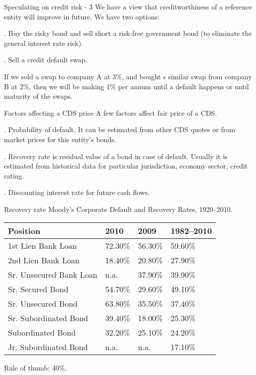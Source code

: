 \documentclass{beamer}
\begin{document}
\begin{frame}{Speculating on credit risk - 3}
\justify
We have a view that creditworthiness of a reference entity will improve in future. We have two options: 

. Buy the risky bond and sell short a risk-free government bond (to eliminate the general interest rate risk).

. Sell a credit default swap.

\justify
If we sold a swap to company A at 3\%, and bought s similar swap from company B at 2\%, then we will be making 1\% per annum until a default happens or until maturity of the swaps.
\end{frame}



\begin{frame}{Factors affecting a CDS price}
\justify
A few factors affect fair price of a CDS.

. Probability of default. It can be estimated from other CDS quotes or from market prices for this entity's bonds.

. Recovery rate is residual value of a bond in case of default. Usually it is estimated from historical data for particular jurisdiction, economy sector, credit rating.

. Discounting interest rate for future cash flows.
\end{frame}



\begin{frame}{Recovery rate}
\justify
Moody's Corporate Default and Recovery Rates, 1920--2010.

\vspace{\baselineskip}
\begin{tabular}{l|l|l|l}
Position						& 2010		& 2009		& 1982--2010 \\
\hline
1st	Lien Bank Loan	 		& 72.30\%	& 56.30\% & 59.60\% \\
2nd Lien Bank Loan 		& 18.40\%	& 20.80\% & 27.90\% \\
Sr. Unsecured	Bank Loan	& n.a.		& 37.90\% & 39.90\% \\
Sr. Secured Bond			& 54.70\%	& 29.60\% & 49.10\%	 \\
\hline
Sr. Unsecured	Bond		& 63.80\%	& 35.50\% & 37.40\%	 \\
\hline
Sr. Subordinated Bond	& 39.40\%	& 18.00\% & 25.30\%	\\
Subordinated Bond		& 32.20\%	& 25.10\% & 24.20\%	\\
Jr. Subordinated Bond	 	& n.a.		& n.a.		&17.10\%	\\
\end{tabular}

\justify
Rule of thumb: 40\%.
\end{frame}
\end{document}
